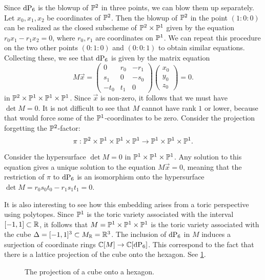 Since $\dP6$ is the blowup of $\P^2$ in three points, we can blow them up separately. Let $x_0,x_1,x_2$ be coordinates of $\P^2$. Then the blowup of $\P^2$ in the point $(1:0:0)$ can be realized as the closed subscheme of $\P^2 \times \P^1$ given by the equation $r_0x_1-r_1x_2=0$, where $r_0,r_1$ are coordinates on $\P^1$. We can repeat this procedure on the two other points $(0:1:0)$ and $(0:0:1)$ to obtain similar equations. Collecting these, we see that $\dP6$ is given by the matrix equation
\[
M\vec x = 
\begin{pmatrix}
0 & r_0 & -r_1 \\
s_1 & 0 & -s_0 \\
-t_0 & t_1 & 0
\end{pmatrix}
\begin{pmatrix}
x_0 \\ y_0 \\ z_0
\end{pmatrix}= 0.
\]
in $\P^2 \times \P^1 \times \P^1 \times \P^1$. Since $\vec x$ is non-zero, it follows that we must have $\det M = 0$. It is not difficult to see that $M$ cannot have rank $1$ or lower, because that would force some of the $\P^1$-coordinates to be zero. Consider the projection forgetting the $\P^2$-factor:
$$
\pi:\P^2 \times \P^1 \times \P^1 \times \P^1 \to \P^1 \times \P^1 \times \P^1.
$$

Consider the hypersurface $\det M = 0$ in $\P^1 \times \P^1 \times \P^1$. Any solution to this equation gives a unique solution to the equation $M \vec x = 0$, meaning that the restriction of $\pi$ to $\dP6$ is an isomorphism onto the hypersurface $\det M=r_0s_0t_0-r_1s_1t_1=0$. 

It is also interesting to see how this embedding arises from a toric perspective using polytopes. Since $\P^1$ is the toric variety associated with the interval $[-1,1] \subset \R$, it follows that $M = \P^1 \times \P^1 \times \P^1$ is the toric variety associated with the cube $\Delta = [-1,1]^3 \subset M_\R = \R^3$. The inclusion of $\dP6$ in $M$ induces a surjection of coordinate rings $\C[M] \to \C[\dP6]$. This correspond to the fact that there is a lattice projection of the cube onto the hexagon. See \cref{fig:cube_projection}.

\begin{figure}[t]
\centering 

\caption{The projection of a cube onto a hexagon.}
\label{fig:cube_projection}
\end{figure}

